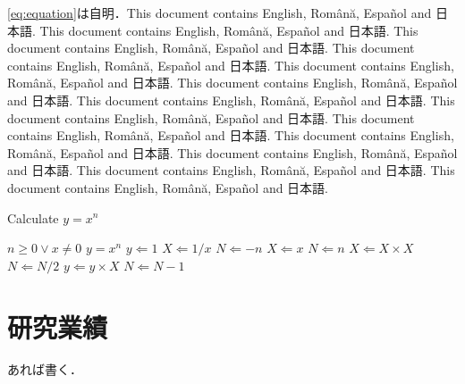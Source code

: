 \documentclass[
	10pt,
	a4j,		%
	twocolumn,	%
	uplatex
]{jsarticle}
\renewcommand{\ref}{\cref}
\begin{document}
\ref{eq:equation}は自明．This document contains English, Română, Español and 日本語. This document contains English, Română, Español and 日本語. This document contains English, Română, Español and 日本語. This document contains English, Română, Español and 日本語. This document contains English, Română, Español and 日本語. This document contains English, Română, Español and 日本語. This document contains English, Română, Español and 日本語. This document contains English, Română, Español and 日本語. This document contains English, Română, Español and 日本語. This document contains English, Română, Español and 日本語. This document contains English, Română, Español and 日本語. This document contains English, Română, Español and 日本語. This document contains English, Română, Español and 日本語. 

\begin{algorithm}[t]
	\caption{Calculate $y = x^n$}
	\label{alg:algorithm}
	\begin{algorithmic}[1]
		\Require	$n \geq 0 \vee x \neq 0$
		\Ensure	$y = x^n$
		\State $y \Leftarrow 1$
				\State $X \Leftarrow 1 / x$
				\State $N \Leftarrow -n$
			\Else
				\State $X \Leftarrow x$
				\State $N \Leftarrow n$
			\EndIf
				\State $X \Leftarrow X \times X$
				\State $N \Leftarrow N / 2$
			\Else[$N$ is odd]
				\State $y \Leftarrow y \times X$
				\State $N \Leftarrow N - 1$
			\EndIf
		\EndWhile
	\end{algorithmic}
\end{algorithm}


{\footnotesize
	
}

\section*{研究業績}
あれば書く．
\end{document}
